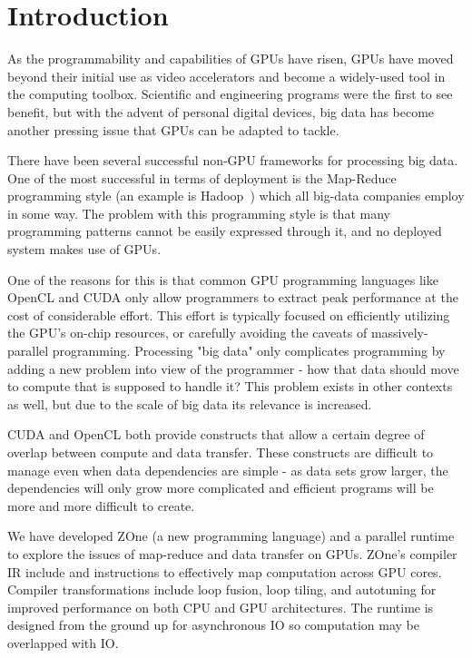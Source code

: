 \section{Introduction}

As the programmability and capabilities of GPUs have risen, GPUs have moved
beyond their initial use as video accelerators and become a widely-used tool
in the computing toolbox. Scientific and engineering programs were the first
to see benefit, but with the advent of personal digital devices, big data has
become another pressing issue that GPUs can be adapted to tackle.

There have been several successful non-GPU frameworks for processing big data.
One of the most successful in terms of deployment is the
Map-Reduce~\cite{MapReduce} programming style (an example is
Hadoop~\cite{Hadoop}) which
all big-data companies employ in some way. The problem with this
programming style is that many programming patterns cannot be easily
expressed through it, and no deployed system makes use of GPUs.

One of the reasons for this is that common GPU programming languages like
OpenCL and CUDA only allow programmers to extract peak performance
at the cost of
considerable effort. This effort is typically focused on efficiently
utilizing the GPU's
on-chip resources, or carefully avoiding the caveats of massively-parallel
programming. Processing "big data" only complicates programming by adding
a new problem into view of the
programmer - how that data should move to compute that is supposed to
handle it? This problem exists in other contexts as well, but due to the scale
of big data its relevance is increased.

CUDA and OpenCL both provide constructs that allow a certain degree of
overlap between compute and data transfer. These constructs are difficult to
manage even when data dependencies are simple - as data sets grow larger, the
dependencies will only grow more complicated and efficient programs will be
more and more difficult to create.

We have developed ZOne (a new programming language) and a parallel runtime
to explore the issues of map-reduce and data transfer on GPUs.
ZOne's compiler IR include  and 
 instructions to effectively map computation across
GPU cores. Compiler transformations include loop fusion,
loop tiling, and autotuning for improved performance on both CPU
and GPU architectures. The runtime is designed from the ground up
for asynchronous IO so computation may be overlapped with IO.
